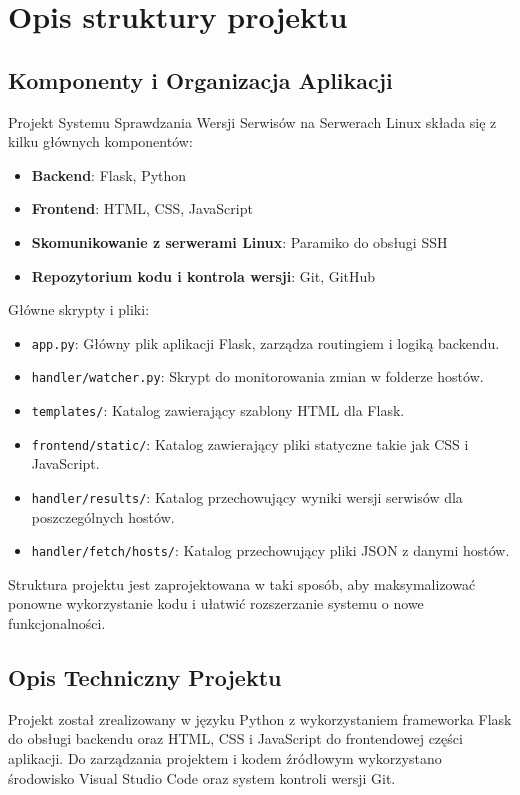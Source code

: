 \chapter{Opis struktury projektu}
\section{Komponenty i Organizacja Aplikacji}

Projekt Systemu Sprawdzania Wersji Serwisów na Serwerach Linux składa się z kilku głównych komponentów:

\begin{itemize}
\item \textbf{Backend}: Flask, Python
\item \textbf{Frontend}: HTML, CSS, JavaScript
\item \textbf{Skomunikowanie z serwerami Linux}: Paramiko do obsługi SSH
\item \textbf{Repozytorium kodu i kontrola wersji}: Git, GitHub
\end{itemize}

Główne skrypty i pliki:

\begin{itemize}
\item \texttt{app.py}: Główny plik aplikacji Flask, zarządza routingiem i logiką backendu.
\item \texttt{handler/watcher.py}: Skrypt do monitorowania zmian w folderze hostów.
\item \texttt{templates/}: Katalog zawierający szablony HTML dla Flask.
\item \texttt{frontend/static/}: Katalog zawierający pliki statyczne takie jak CSS i JavaScript.
\item \texttt{handler/results/}: Katalog przechowujący wyniki wersji serwisów dla poszczególnych hostów.
\item \texttt{handler/fetch/hosts/}: Katalog przechowujący pliki JSON z danymi hostów.
\end{itemize}


Struktura projektu jest zaprojektowana w taki sposób, aby maksymalizować ponowne wykorzystanie kodu i ułatwić rozszerzanie systemu o nowe funkcjonalności.

\section{Opis Techniczny Projektu}

Projekt został zrealizowany w języku Python z wykorzystaniem frameworka Flask do obsługi backendu oraz HTML, CSS i JavaScript do frontendowej części aplikacji. Do zarządzania projektem i kodem źródłowym wykorzystano środowisko Visual Studio Code oraz system kontroli wersji Git.

